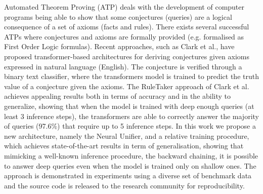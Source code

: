 Automated Theorem Proving (ATP) deals with the development of computer programs being able to show that some conjectures (queries) are a logical consequence of a set of axioms (facts and rules). There exists several successful ATPs where conjectures and axioms are formally provided (e.g. formalised as First Order Logic formulas). Recent approaches, such as Clark et al., have proposed transformer-based architectures for deriving conjectures given axioms expressed in natural language (English). The conjecture is verified through a binary text classifier, where the transformers model is trained to predict the truth value of a conjecture given the axioms. The RuleTaker approach of Clark et al. achieves appealing results both in terms of accuracy and in the ability to generalize, showing that when the model is trained with deep enough queries (at least 3 inference steps), the transformers are able to correctly answer the majority of queries (97.6\%) that require up to 5 inference steps. In this work we propose a new architecture, namely the Neural Unifier, and a relative training procedure, which achieves state-of-the-art results in term of generalisation, showing that mimicking a well-known inference procedure, the backward chaining, it is possible to answer deep queries even when the model is trained only on shallow ones. The approach is demonstrated in experiments using a diverse set of benchmark data and the source code is released to the research community for reproducibility.
